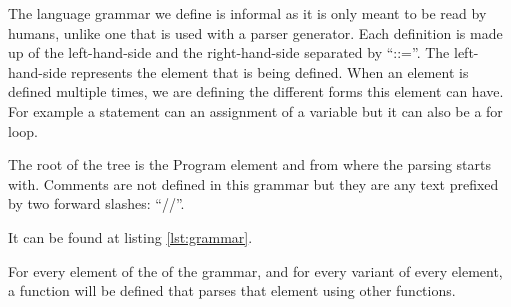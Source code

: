 \documentclass{article}
\begin{document}
The language grammar we define is informal as it is only meant to be read by
humans, unlike one that is used with a parser generator. Each definition is
made up of the left-hand-side and the right-hand-side separated by ``::=''.
The left-hand-side represents the element that is being defined. When an
element is defined multiple times, we are defining the different forms this
element can have. For example a statement can an assignment of a variable but
it can also be a for loop.

The root of the tree is the Program element and from where the parsing starts
with. Comments are not defined in this grammar but they are any text prefixed
by two forward slashes: ``//''.

It can be found at listing \ref{lst:grammar}.

For every element of the of the grammar, and for every variant of every
element, a function will be defined that parses that element using other
functions.
\end{document}
